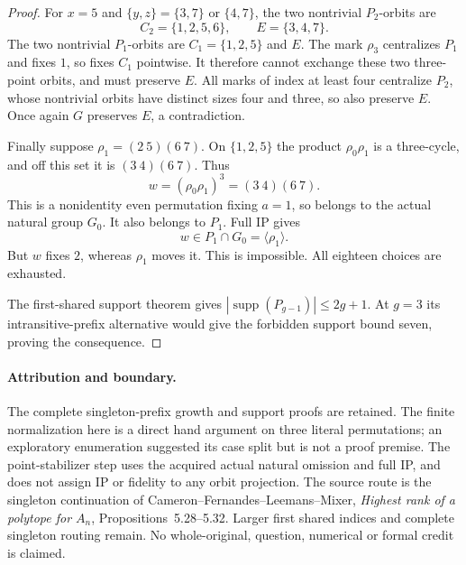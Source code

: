 \documentclass[11pt,a4paper]{article}
\newcommand{\gen}[1]{\langle#1\rangle}
\begin{document}
\begin{proof}
For $x=5$ and $\{y,z\}=\{3,7\}$ or $\{4,7\}$,
the two nontrivial $P_2$-orbits are
\[
                  C_2=\{1,2,5,6\},\qquad E=\{3,4,7\}.
\]
The two nontrivial $P_1$-orbits are $C_1=\{1,2,5\}$ and
$E$. The mark $\rho_3$ centralizes $P_1$ and fixes $1$,
so fixes $C_1$ pointwise. It therefore cannot exchange these
two three-point orbits, and must preserve $E$.
All marks of index at least four centralize $P_2$, whose
nontrivial orbits have distinct sizes four and three, so also
preserve $E$. Once again $G$ preserves $E$, a contradiction.

Finally suppose $\rho_1=(2\ 5)(6\ 7)$. On
$\{1,2,5\}$ the product $\rho_0\rho_1$ is a three-cycle,
and off this set it is $(3\ 4)(6\ 7)$. Thus
\[
             w=(\rho_0\rho_1)^3=(3\ 4)(6\ 7).
\]
This is a nonidentity even permutation fixing $a=1$,
so belongs to the actual natural group $G_0$. It also
belongs to $P_1$. Full IP gives
\[
               w\in P_1\cap G_0=\gen{\rho_1}.
\]
But $w$ fixes $2$, whereas $\rho_1$ moves it. This is
impossible. All eighteen choices are exhausted.

The first-shared support theorem gives
$|\operatorname{supp}(P_{g-1})|\le2g+1$.
At $g=3$ its intransitive-prefix alternative would give
the forbidden support bound seven, proving the consequence.
\end{proof}

\paragraph{Attribution and boundary.}
The complete singleton-prefix growth and support proofs are retained.
The finite normalization here is a direct hand argument on three
literal permutations; an exploratory enumeration suggested its case
split but is not a proof premise. The point-stabilizer step uses
the acquired actual natural omission and full IP, and does not
assign IP or fidelity to any orbit projection. The source route is
the singleton continuation of Cameron--Fernandes--Leemans--Mixer,
\emph{Highest rank of a polytope for $A_n$}, Propositions~5.28--5.32.
Larger first shared indices and complete singleton routing remain.
No whole-original, question, numerical or formal credit is claimed.
\end{document}
